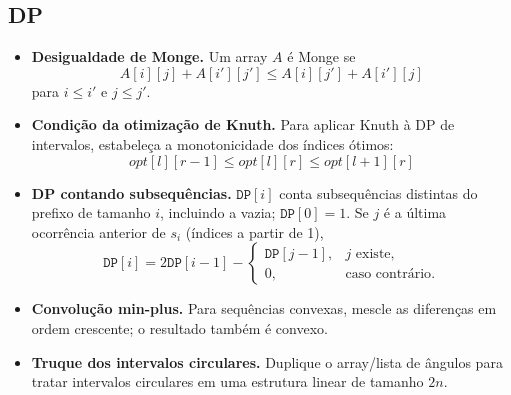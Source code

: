 
\subsection{DP}
\begin{itemize}[leftmargin=*,label={}]
	\ifextended
	\item \textbf{Desigualdade de Monge.}
		Um array $A$ é Monge se
		\[
			A[i][j]+A[i'][j'] \le A[i][j']+A[i'][j]
		\]
		para $i\le i'$ e $j\le j'$.
		\fi

		\ifextended
	\item \textbf{Condição da otimização de Knuth.}
		Para aplicar Knuth à DP de intervalos, estabeleça a monotonicidade dos índices ótimos:
		\[
			opt[l][r-1] \le opt[l][r] \le opt[l+1][r]
		\]
		\fi

	\item \textbf{DP contando subsequências.}
$\mathtt{DP}[i]$ conta subsequências distintas do prefixo de tamanho $i$, incluindo a vazia; $\mathtt{DP}[0]=1$. Se $j$ é a última ocorrência anterior de $s_i$ (índices a partir de 1),
\[
\mathtt{DP}[i]=2\mathtt{DP}[i-1]-\begin{cases}\mathtt{DP}[j-1],&j\text{ existe},\\0,&\text{caso contrário}.\end{cases}
\]

	\item \textbf{Convolução min-plus.}
		Para sequências convexas, mescle as diferenças em ordem crescente; o resultado também é convexo.

		\ifextended
	\item \textbf{Truque dos intervalos circulares.}
		Duplique o array/lista de ângulos para tratar intervalos circulares em uma estrutura linear de tamanho $2n$.
		\fi

\end{itemize}


